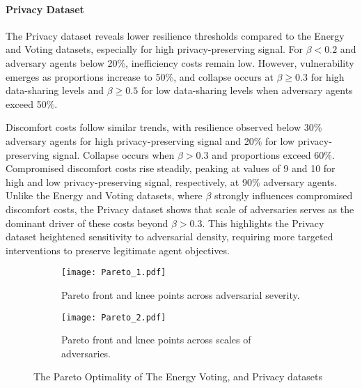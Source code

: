 \documentclass[journal]{IEEEtran}
\begin{document}
\paragraph{Privacy Dataset}
The Privacy dataset reveals lower resilience thresholds compared to the Energy and Voting datasets, especially for high privacy-preserving signal. For $\beta < 0.2$ and adversary agents below 20\%, inefficiency costs remain low. However, vulnerability emerges as proportions increase to 50\%, and collapse occurs at $\beta \geq 0.3$ for high data-sharing levels and $\beta \geq 0.5$ for low data-sharing levels when adversary agents exceed 50\%.

Discomfort costs follow similar trends, with resilience observed below 30\% adversary agents for high privacy-preserving signal and 20\% for low privacy-preserving signal. Collapse occurs when $\beta > 0.3$ and proportions exceed 60\%. Compromised discomfort costs rise steadily, peaking at values of 9 and 10 for high and low privacy-preserving signal, respectively, at 90\% adversary agents. Unlike the Energy and Voting datasets, where $\beta$ strongly influences compromised discomfort costs, the Privacy dataset shows that scale of adversaries serves as the dominant driver of these costs beyond $\beta > 0.3$. This highlights the Privacy dataset heightened sensitivity to adversarial density, requiring more targeted interventions to preserve legitimate agent objectives.

\begin{figure*}[htbp]
  \centering
  \begin{subfigure}{0.98\textwidth} 
    \texttt{[image: Pareto\_1.pdf]}
    \centering
    \caption{Pareto front and knee points across adversarial severity.}
    \label{fig:pareto_level}
  \end{subfigure}

  \begin{subfigure}{0.98\textwidth}
    \texttt{[image: Pareto\_2.pdf]}
    \centering
    \caption{Pareto front and knee points across scales of adversaries.}
    \label{fig:pareto_adv}
  \end{subfigure}

\caption{The Pareto Optimality of The Energy Voting, and Privacy datasets}
\label{fig:pareto}
\end{figure*}
\end{document}
